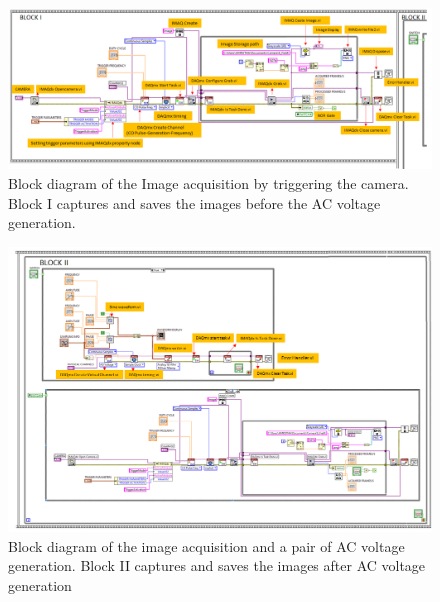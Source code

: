\documentclass[journal=jacsat,manuscript=article]{achemso}
\begin{document}
\begin{figure}[H]
    \centering
    \includegraphics[width=1.3\textwidth,angle=90]{BLOCK1.png}
    \caption{Block diagram of the Image acquisition by triggering the camera. Block I captures
and saves the images before the AC voltage generation.}
    \label{fig:ex8}
\end{figure}
\begin{figure}[H]
    \centering
    \includegraphics[width=1.3\linewidth, angle=90]{cpef_block2.png}
    \caption{Block diagram of the image acquisition and a pair of AC voltage generation. Block II
captures and saves the images after AC voltage generation}
    \label{fig:ex9}
\end{figure}
\end{document}
